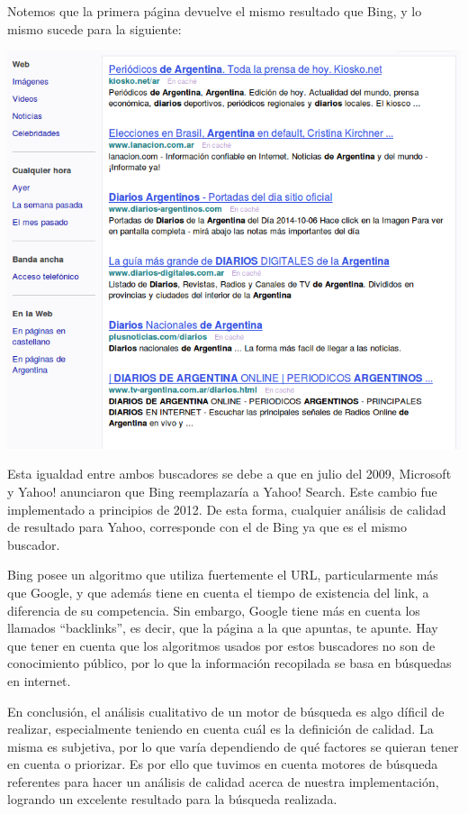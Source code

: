 Notemos que la primera página devuelve el mismo resultado que Bing, y lo mismo sucede para la siguiente:

	\par 
	\begin{center}
		\includegraphics[scale=0.5]{./img/segundapaginayahoo.png}
	\end{center}
	\par

Esta igualdad entre ambos buscadores se debe a que en julio del 2009, Microsoft y Yahoo! anunciaron que Bing reemplazaría a Yahoo! Search. Este cambio fue implementado a principios de 2012. De esta forma, cualquier análisis de calidad de resultado para Yahoo, corresponde con el de Bing ya que es el mismo buscador.
\par 
Bing posee un algoritmo que utiliza fuertemente el URL, particularmente más que Google, y que además tiene en cuenta el tiempo de existencia del link, a diferencia de su competencia. Sin embargo, Google tiene más en cuenta los llamados ``backlinks'', es decir, que la página a la que apuntas, te apunte. Hay que tener en cuenta que los algoritmos usados por estos buscadores no son de conocimiento público, por lo que la información recopilada se basa en búsquedas en internet.
\par 
En conclusión, el análisis cualitativo de un motor de búsqueda es algo díficil de realizar, especialmente teniendo en cuenta cuál es la definición de calidad. La misma es subjetiva, por lo que varía dependiendo de qué factores se quieran tener en cuenta o priorizar. Es por ello que tuvimos en cuenta motores de búsqueda referentes para hacer un análisis de calidad acerca de nuestra implementación, logrando un excelente resultado para la búsqueda realizada.
	
